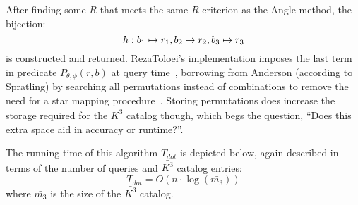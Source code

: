 \documentclass[conference]{IEEEtran}
\begin{document}
    After finding some $R$ that meets the same $R$ criterion as the Angle method, the bijection:
    \begin{equation}
        h: b_1 \mapsto r_1, b_2 \mapsto r_2, b_3 \mapsto r_3
    \end{equation}
    is constructed and returned.
    RezaToloei's implementation imposes the last term in predicate $P_{\theta, \phi}(r, b)$ at query
    time~\cite{toloei:compositeIdentification}, borrowing from Anderson (according to Spratling) by searching all
    permutations instead of combinations to remove the need for a star mapping
    procedure~\cite{anderson:autonomousStarSensing}.
    Storing permutations does increase the storage required for the $\bar{K^3}$ catalog though, which begs the question,
    ``Does this extra space aid in accuracy or runtime?''.


    The running time of this algorithm $T_{dot}$ is depicted below, again described in terms of the number of queries
    and $\bar{K^3}$ catalog entries:
    \begin{equation}\label{eq:dotComplexity}
    T_{dot} = O\left( n \cdot \log(\bar{m_3}) \right)
    \end{equation}
    where $\bar{m_3}$ is the size of the $\bar{K^3}$ catalog.

\end{document}
